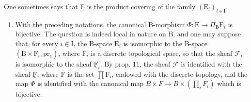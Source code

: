 One sometimes says that E is the product covering of the family \((\mathrm{E}_i)_{i\in \mathrm{I}}\).

\begin{enumerate}
\def\labelenumi{\arabic{enumi})}
\setcounter{enumi}{1}
\tightlist
\item
  With the preceding notations, the canonical B-morphism \(\Phi\colon\mathrm{E}\to\Pi_{\mathrm{B}}\mathrm{E}_{i}\) is bijective. The question is indeed local in nature on B, and one may suppose that, for every \(i\in\mathrm{I}\), the B-space \(\mathrm{E}_{i}\) is isomorphic to the B-space \((\mathrm{B}\times\mathrm{F}_{i},\mathrm{pr}_{1})\), where \(\mathrm{F}_{i}\) is a discrete topological space, so that the sheaf \(\mathcal{F}_{i}\) is isomorphic to the sheaf \(\underline{\mathrm{F}}_{i}\). By prop. 11, the sheaf \(\mathcal{F}\) is identified with the sheaf \(\underline{\mathrm{F}}\), where \(\mathrm{F}\) is the set \(\prod\mathrm{F}_{i}\), endowed with the discrete topology, and the map \(\Phi\) is identified with the canonical map \(B \times F \rightarrow B \times (\prod_{i} F_{i})\) which is bijective.
\end{enumerate}

